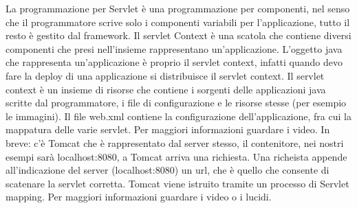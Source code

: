 La programmazione per Servlet è una programmazione per componenti, nel senso che il programmatore scrive solo i componenti variabili per l'applicazione, tutto il resto è gestito dal framework.\newline
Il servlet Context è una scatola che contiene diversi componenti che presi nell'insieme rappresentano un'applicazione. L'oggetto java che rappresenta un'applicazione è proprio il servlet context, infatti quando devo fare la deploy di una applicazione si distribuisce il servlet context. Il servlet context è un insieme di risorse che contiene i sorgenti delle applicazioni java scritte dal programmatore, i file di configurazione e le risorse stesse (per esempio le immagini).\newline
Il file web.xml contiene la configurazione dell'applicazione, fra cui la mappatura delle varie servlet. Per maggiori informazioni guardare i video. In breve: c'è Tomcat che è rappresentato dal server stesso, il contenitore, nei nostri esempi sarà localhost:8080, a Tomcat arriva una richiesta. Una richeista appende all'indicazione del server (localhost:8080) un url, che è quello che consente di scatenare la servlet corretta. Tomcat viene istruito tramite un processo di Servlet mapping. Per maggiori informazioni guardare i video o i lucidi.\newline
